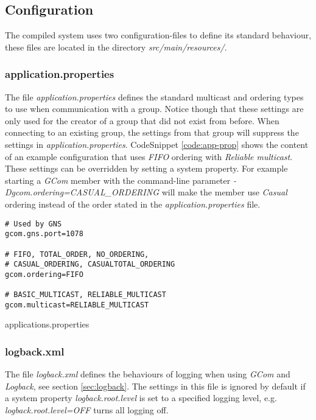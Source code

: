 \documentclass[titlepage, twocolumn, a4paper, 10pt]{article}
\begin{document}
\subsection{Configuration}\label{sec:configuration}
The compiled system uses two configuration-files to define its
standard behaviour, these files are located in the directory
\textit{src/main/resources/}.

\subsubsection{application.properties}\label{sec:application.properties}
The file \textit{application.properties} defines the standard
multicast and ordering types to use when communication with a group.
Notice though that these settings are only used for the creator of a
group that did not exist from before. When connecting to an existing
group, the settings from that group will suppress the settings in
\textit{application.properties}. CodeSnippet \ref{code:app-prop} shows
the content of an example configuration that uses \textit{FIFO}
ordering with \textit{Reliable multicast}. These settings can be
overridden by setting a system property. For example starting a
\textit{GCom} member with the command-line parameter
\mbox{\textit{-Dgcom.ordering=CASUAL\_ORDERING}} will make the member
use \textit{Casual} ordering instead of the order stated in the
\textit{application.properties} file.

\begin{code}
  \begin{footnotesize}
\begin{verbatim}
# Used by GNS
gcom.gns.port=1078

# FIFO, TOTAL_ORDER, NO_ORDERING,
# CASUAL_ORDERING, CASUALTOTAL_ORDERING
gcom.ordering=FIFO

# BASIC_MULTICAST, RELIABLE_MULTICAST
gcom.multicast=RELIABLE_MULTICAST
\end{verbatim}
  \end{footnotesize}
  \caption{applications.properties}\label{code:app-prop}
\end{code}

\subsubsection{logback.xml}\label{sec:logback.xml}
The file \textit{logback.xml} defines the behaviours of logging when
using \textit{GCom} and \textit{Logback}, see section
\ref{sec:logback}. The settings in this file is ignored by default if
a system property \textit{logback.root.level} is set to a specified
logging level, e.g. \textit{\textit{logback.root.level=OFF}} turns all
logging off.
\end{document}

